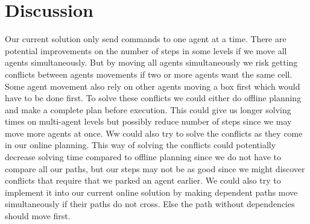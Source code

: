 \section{Discussion}
\label{sec:discussion}
Our current solution only send commands to one agent at a time.
There are potential improvements on the number of steps in some levels if we move all agents simultaneously.
But by moving all agents simultaneously we risk getting conflicts between agents movements if two or more agents want the same cell.
Some agent movement also rely on other agents moving a box first which would have to be done first.
To solve these conflicts we could either do offline planning and make a complete plan before execution.
This could give us longer solving times on multi-agent levels but possibly reduce number of steps since we may move more agents at once. %
Ww could also try to solve the conflicts as they come in our online planning.
This way of solving the conflicts could potentially decrease solving time compared to offline planning since we do not have to compare all our paths,
but our steps may not be as good since we might discover conflicts that require that we parked an agent earlier.
We could also try to implement it into our current online solution by making dependent paths move simultaneously if their paths do not cross.
Else the path without dependencies should move first.


